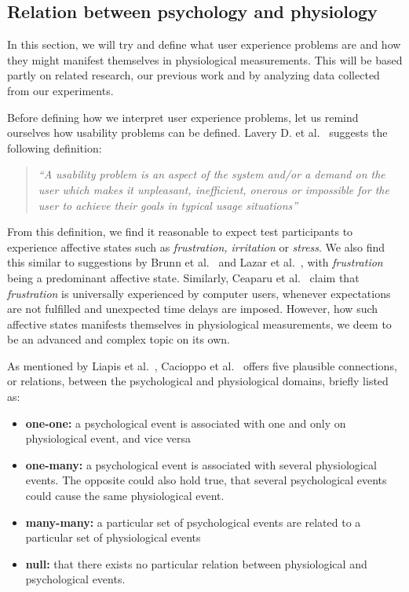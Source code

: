 \subsection{Relation between psychology and physiology}
In this section, we will try and define what user experience problems are and how they might manifest themselves in
physiological measurements. This will be based partly on related research, our previous work and by analyzing data
collected from our experiments.

Before defining how we interpret user experience problems, let us remind ourselves how usability problems can be
defined. Lavery D. et al.~\cite[p. 254]{comp-eval-methods} suggests the following definition:

\begin{quotation}
  \textit{``A usability problem is an aspect of the system and/or a demand on the user which makes it unpleasant,
    inefficient, onerous or impossible for the user to achieve their goals in typical usage situations''} 
\end{quotation}

From this definition, we find it reasonable to expect test participants to experience affective states such as
\textit{frustration, irritation} or \textit{stress}. We also find this similar to suggestions by Brunn et
al.~\cite{LH-paper} and Lazar et al.~\cite{frustration_with_computers}, with \textit{frustration} being a predominant
affective state. Similarly, Ceaparu et al.~\cite{determining-causes-end-user-frust} claim that \textit{frustration} is
universally experienced by computer users, whenever expectations are not fulfilled and unexpected time delays are
imposed. However, how such affective states manifests themselves in physiological measurements, we deem to be an
advanced and complex topic on its own.

As mentioned by Liapis et al.~\cite{fusion4}, Cacioppo et al.~\cite[p. 8-9]{handbook-psychophysiology} offers five
plausible connections, or relations, between the psychological and physiological domains, briefly listed as:

\begin{itemize}[noitemsep, nolistsep]
\item \textbf{one-one:} a psychological event is associated with one and only on physiological event, and vice versa
\item \textbf{one-many:} a psychological event is associated with several physiological events. The opposite could also
  hold true, that several psychological events could cause the same physiological event.
\item \textbf{many-many:} a particular set of psychological events are related to a particular set of physiological
  events
\item \textbf{null:} that there exists no particular relation between physiological and psychological events.
\end{itemize}

